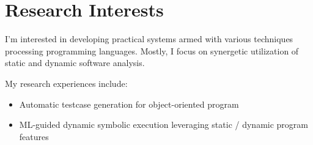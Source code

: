 \section{Research Interests}
I'm interested in developing practical systems armed with various techniques processing programming languages. Mostly, I focus on synergetic utilization of static and dynamic software analysis.
\vspace{1mm}

\renewcommand{\labelitemi}{$\blacktriangleright$}
\addtolength{\leftmargini}{0.3cm}

My research experiences include:

\begin{itemize}
\item Automatic testcase generation for object-oriented program
\vspace{1mm}
\item ML-guided dynamic symbolic execution leveraging static / dynamic program features
\end{itemize}

\vspace{9mm}
